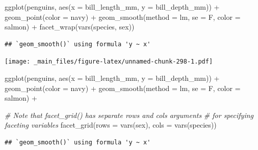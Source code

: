 \documentclass[
]{book}
\newenvironment{Shaded}{\begin{snugshade}}{\end{snugshade}}
\newcommand{\AttributeTok}[1]{\textcolor[rgb]{0.77,0.63,0.00}{#1}}
\newcommand{\CommentTok}[1]{\textcolor[rgb]{0.56,0.35,0.01}{\textit{#1}}}
\newcommand{\FunctionTok}[1]{\textcolor[rgb]{0.00,0.00,0.00}{#1}}
\newcommand{\NormalTok}[1]{#1}
\newcommand{\SpecialCharTok}[1]{\textcolor[rgb]{0.00,0.00,0.00}{#1}}
\newcommand{\StringTok}[1]{\textcolor[rgb]{0.31,0.60,0.02}{#1}}
\begin{document}
\begin{Shaded}
\begin{Highlighting}[]
\FunctionTok{ggplot}\NormalTok{(penguins, }\FunctionTok{aes}\NormalTok{(}\AttributeTok{x =}\NormalTok{ bill\_length\_mm, }\AttributeTok{y =}\NormalTok{ bill\_depth\_mm)) }\SpecialCharTok{+}
  \FunctionTok{geom\_point}\NormalTok{(}\AttributeTok{color =} \StringTok{\textquotesingle{}navy\textquotesingle{}}\NormalTok{) }\SpecialCharTok{+}
  \FunctionTok{geom\_smooth}\NormalTok{(}\AttributeTok{method =} \StringTok{\textquotesingle{}lm\textquotesingle{}}\NormalTok{, }\AttributeTok{se =}\NormalTok{ F, }\AttributeTok{color =} \StringTok{\textquotesingle{}salmon\textquotesingle{}}\NormalTok{) }\SpecialCharTok{+}
  \FunctionTok{facet\_wrap}\NormalTok{(}\FunctionTok{vars}\NormalTok{(species, sex))}
\end{Highlighting}
\end{Shaded}

\begin{verbatim}
## `geom_smooth()` using formula 'y ~ x'
\end{verbatim}

\texttt{[image: \_main\_files/figure-latex/unnamed-chunk-298-1.pdf]}

\begin{Shaded}
\begin{Highlighting}[]
\FunctionTok{ggplot}\NormalTok{(penguins, }\FunctionTok{aes}\NormalTok{(}\AttributeTok{x =}\NormalTok{ bill\_length\_mm, }\AttributeTok{y =}\NormalTok{ bill\_depth\_mm)) }\SpecialCharTok{+}
  \FunctionTok{geom\_point}\NormalTok{(}\AttributeTok{color =} \StringTok{\textquotesingle{}navy\textquotesingle{}}\NormalTok{) }\SpecialCharTok{+}
  \FunctionTok{geom\_smooth}\NormalTok{(}\AttributeTok{method =} \StringTok{\textquotesingle{}lm\textquotesingle{}}\NormalTok{, }\AttributeTok{se =}\NormalTok{ F, }\AttributeTok{color =} \StringTok{\textquotesingle{}salmon\textquotesingle{}}\NormalTok{) }\SpecialCharTok{+}
  
  \CommentTok{\# Note that facet\_grid() has separate \textasciigrave{}rows\textasciigrave{} and \textasciigrave{}cols\textasciigrave{} arguments }
  \CommentTok{\# for specifying faceting variables}
  \FunctionTok{facet\_grid}\NormalTok{(}\AttributeTok{rows =} \FunctionTok{vars}\NormalTok{(sex), }\AttributeTok{cols =} \FunctionTok{vars}\NormalTok{(species)) }
\end{Highlighting}
\end{Shaded}

\begin{verbatim}
## `geom_smooth()` using formula 'y ~ x'
\end{verbatim}
\end{document}
